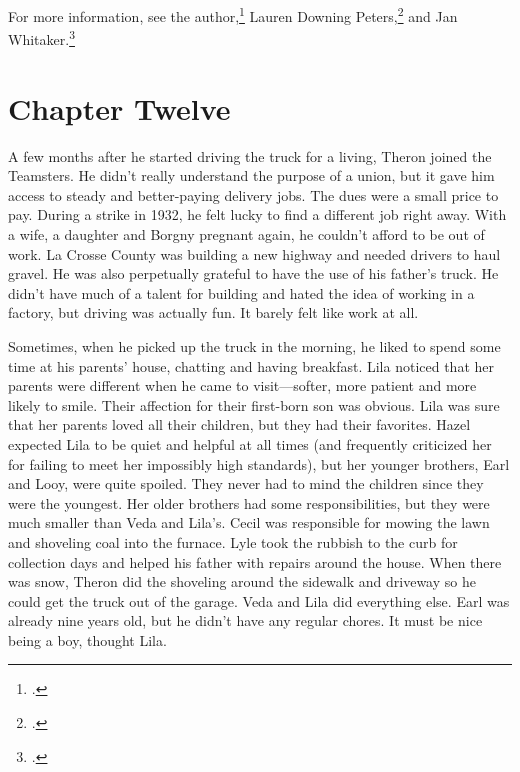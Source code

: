 \documentclass[
  american,
  letterpaper,
]{book}
\begin{document}
For more information, see the author,\footnote{.} Lauren Downing Peters,\footnote{.} and Jan Whitaker.\footnote{.}


\chapter{Chapter Twelve}\label{chapter-twelve}

A few months after he started driving the truck for a living, Theron
joined the Teamsters. He didn't really understand the purpose of a
union, but it gave him access to steady and better-paying delivery jobs.
The dues were a small price to pay. During a strike in 1932, he felt
lucky to find a different job right away. With a wife, a daughter and
Borgny pregnant again, he couldn't afford to be out of work. La Crosse
County was building a new highway and needed drivers to haul gravel. He
was also perpetually grateful to have the use of his father's truck. He
didn't have much of a talent for building and hated the idea of working
in a factory, but driving was actually fun. It barely felt like work at
all.

Sometimes, when he picked up the truck in the morning, he liked to spend
some time at his parents' house, chatting and having breakfast. Lila
noticed that her parents were different when he came to visit---softer,
more patient and more likely to smile. Their affection for their
first-born son was obvious. Lila was sure that her parents loved all
their children, but they had their favorites. Hazel expected Lila to be
quiet and helpful at all times (and frequently criticized her for
failing to meet her impossibly high standards), but her younger
brothers, Earl and Looy, were quite spoiled. They never had to mind the
children since they were the youngest. Her older brothers had some
responsibilities, but they were much smaller than Veda and Lila's. Cecil
was responsible for mowing the lawn and shoveling coal into the furnace.
Lyle took the rubbish to the curb for collection days and helped his
father with repairs around the house. When there was snow, Theron did
the shoveling around the sidewalk and driveway so he could get the truck
out of the garage. Veda and Lila did everything else. Earl was already
nine years old, but he didn't have any regular chores. It must be nice
being a boy, thought Lila.
\end{document}

